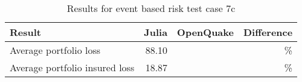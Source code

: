 \begin{table}[htbp]

\centering
\begin{tabular}{ l r r r }

\hline
\rowcolor{anti-flashwhite}
\bf{Result} & \bf{Julia} & \bf{OpenQuake} & \bf{Difference}\\
\hline
Average portfolio loss & 88.10 &  & \% \\
Average portfolio insured loss & 18.87 &  & \% \\
\hline
\end{tabular}

\caption{Results for event based risk test case 7c}
\label{tab:result-ebr-7c}
\end{table}